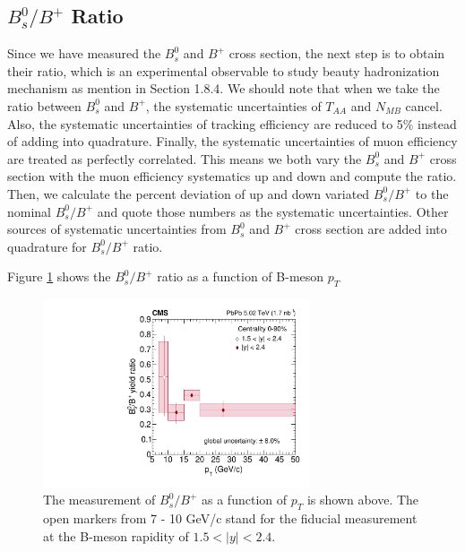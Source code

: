 \subsection{$B^0_s/B^{+}$ Ratio}

Since we have measured the $B^0_s$ and $B^+$ cross section, the next step is to obtain their ratio, which is an experimental observable to study beauty hadronization mechanism as mention in Section 1.8.4. We should note that when we take the ratio between $B^0_s$ and $B^+$, the systematic uncertainties of $T_{AA}$ and $N_{MB}$ cancel. Also, the systematic uncertainties of tracking efficiency are reduced to 5\% instead of adding into quadrature. Finally, the systematic uncertainties of muon efficiency are treated as perfectly correlated. This means we both vary the $B^0_s$ and $B^+$ cross section with the muon efficiency systematics up and down and compute the ratio. Then, we calculate the percent deviation of up and down variated $B^0_s/B^+$ to the nominal $B^0_s/B^+$ and quote those numbers as the systematic uncertainties. Other sources of systematic uncertainties from $B^0_s$ and $B^+$ cross section are added into quadrature for $B^0_s/B^+$ ratio. 

Figure \ref{BsBPPtDataONLY} shows the $B^0_s/B^+$ ratio as a function of B-meson $p_T$



\begin{figure}[hbtp]
\begin{center}
\includegraphics[width=0.70\textwidth]{Figures/Chapter5/ratio_vsPt_ref0_0.pdf}
\caption{The measurement of $B^0_s/B^+$ as a function of $p_T$ is shown above. The open markers from 7 - 10 GeV/c stand for the fiducial measurement at the B-meson rapidity of $1.5 < |y| < 2.4$.}
\label{BsBPPtDataONLY}
\end{center}
\end{figure}

